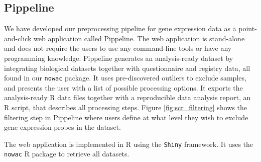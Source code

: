 \subsection{Pippeline} 
We have developed our preprocessing pipeline for gene expression data as a
point-and-click web application called Pippeline. The web application is
stand-alone and does not require the users to use any command-line tools or have
any programming knowledge. Pippeline generates an analysis-ready dataset by
integrating biological datasets together with questionnaire and registry data,
all found in our \texttt{nowac} package. It uses pre-discovered outliers to
exclude samples, and presents the user with a list of possible processing
options. It exports the analysis-ready R data files together with a reproducible
data analysis report, an R script, that describes all processing steps.  Figure
\ref{fig:scr_filtering} shows the filtering step in Pippeline where users define
at what level they wish to exclude gene expression probes in the dataset. 

The web application is implemented in R using the \texttt{Shiny} framework. It
uses the \texttt{nowac} R package to retrieve all datasets. 


